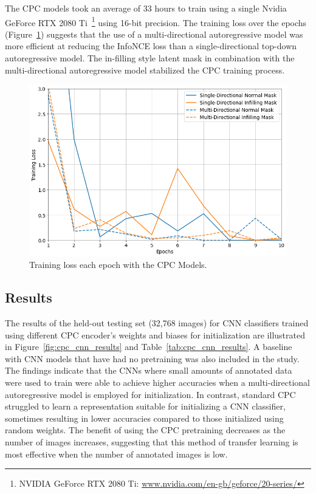 The CPC models took an average of 33 hours to train using a single Nvidia GeForce RTX 2080 Ti~\footnote{NVIDIA GeForce RTX 2080 Ti: \url{www.nvidia.com/en-gb/geforce/20-series/}} using 16-bit precision. The training loss over the epochs (Figure~\ref{fig:cpc_training}) suggests that the use of a multi-directional autoregressive model was more efficient at reducing the InfoNCE loss than a single-directional top-down autoregressive model. The in-filling style latent mask in combination with the multi-directional autoregressive model stabilized the CPC training process.

\begin{figure}[h]
	\centering
	\includegraphics[width=\textwidth]{images/cpc_training.png}
	\caption{Training loss each epoch with the CPC Models.}
	\label{fig:cpc_training}
\end{figure}

\subsection{Results}
\label{subsec:unsupervised_results}
The results of the held-out testing set (32,768 images) for CNN classifiers trained using different CPC encoder's weights and biases for initialization are illustrated in Figure~\ref{fig:cpc_cnn_results} and Table~\ref{tab:cpc_cnn_results}. A baseline with CNN models that have had no pretraining was also included in the study. The findings indicate that the CNNs where small amounts of annotated data were used to train were able to achieve higher accuracies when a multi-directional autoregressive model is employed for initialization. In contrast, standard CPC struggled to learn a representation suitable for initializing a CNN classifier, sometimes resulting in lower accuracies compared to those initialized using random weights. The benefit of using the CPC pretraining decreases as the number of images increases, suggesting that this method of transfer learning is most effective when the number of annotated images is low.

